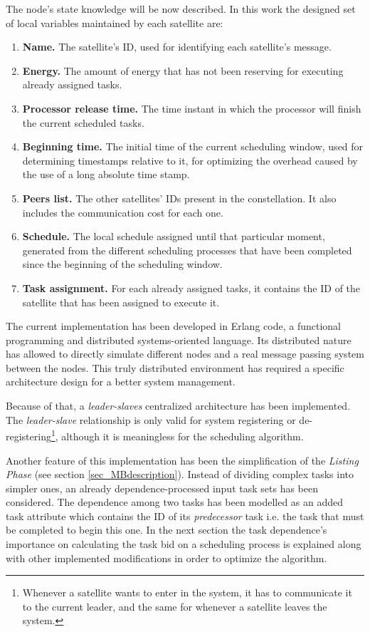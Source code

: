 The node's state knowledge will be now described. In this work the designed set of local variables maintained by each satellite are:

\begin{enumerate}
\item \textbf{Name.} The satellite's ID, used for identifying each satellite's message.
\item \textbf{Energy.} The amount of energy that has not been reserving for executing already assigned tasks.
\item \textbf{Processor release time.} The time instant in which the processor will finish the current scheduled tasks.
\item \textbf{Beginning time.} The initial time of the current scheduling window, used for determining timestamps relative to it, for optimizing the overhead caused by the use of a long absolute time stamp.
\item \textbf{Peers list.} The other satellites' IDs present in the constellation. It also includes the communication cost for each one.
\item \textbf{Schedule.} The local schedule assigned until that particular moment, generated from the different scheduling processes that have been completed since the beginning of the scheduling window.
\item \textbf{Task assignment.} For each already assigned tasks, it contains the ID of the satellite that has been assigned to execute it.
\end{enumerate}

The current implementation has been developed in Erlang code, a functional programming and distributed systems-oriented language. Its distributed nature has allowed to directly simulate different nodes and a real message passing system between the nodes. This truly distributed environment has required a specific architecture design for a better system management.

Because of that, a \emph{leader-slaves} centralized architecture has been implemented. The \emph{leader-slave} relationship is only valid for system registering or de-registering\footnote{Whenever a satellite wants to enter in the system, it has to communicate it to the current leader, and the same for whenever a satellite leaves the system.}, although it is meaningless for the scheduling algorithm.

Another feature of this implementation has been the simplification of the \emph{Listing Phase} (see section \ref{sec_MBdescription}). Instead of dividing complex tasks into simpler ones, an already dependence-processed input task sets has been considered. The dependence among two tasks has been modelled as an added task attribute which contains the ID of its \emph{predecessor} task i.e. the task that must be completed to begin this one. In the next section the task dependence's importance on calculating the task bid on a scheduling process is explained along with other implemented modifications in order to optimize the algorithm.